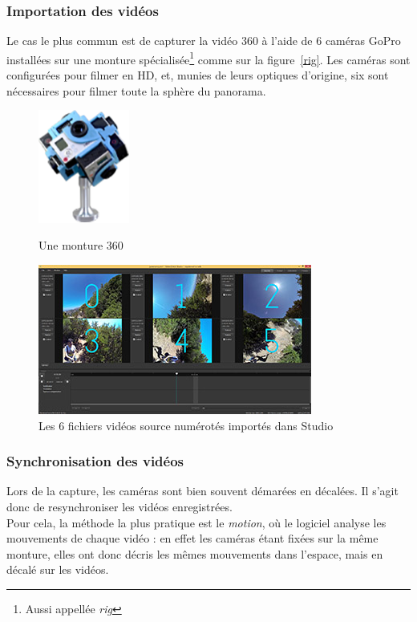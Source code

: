 \subsubsection{Importation des vidéos}
\label{importation-videos}
Le cas le plus commun est de capturer la vidéo 360 à l'aide de 6 caméras GoPro 
installées sur une monture spécialisée\footnote{Aussi appellée \textit{rig}} comme sur la figure~\ref{rig}. 
Les caméras sont configurées pour filmer en HD, et, munies de leurs optiques 
d'origine, six sont nécessaires pour filmer toute la sphère du panorama.
\begin{figure}
  \centering
  \begin{minipage}[b]{0.3\textwidth}
    \centering
    \includegraphics[width=3cm]{images/rig.png}
    \caption{Une monture 360}
    \label{rig}
  \end{minipage}%
  \hspace{0.04\textwidth}
  \begin{minipage}[b]{0.65\textwidth}
    \centering
    \includegraphics[width=9cm]{images/studio-sources-numeros.jpg}
    \caption{Les 6 fichiers vidéos source numérotés importés dans Studio}
    \label{importation}
  \end{minipage}
\end{figure}

\subsubsection{Synchronisation des vidéos}
Lors de la capture, les caméras sont bien souvent démarées en décalées. Il s'agit
donc de resynchroniser les vidéos enregistrées.\\
Pour cela, la méthode la plus pratique est le \textit{motion},
où le logiciel analyse les mouvements de chaque vidéo : en effet les caméras étant fixées
sur la même monture, elles ont donc décris les mêmes mouvements dans l'espace, mais 
en décalé sur les vidéos.

